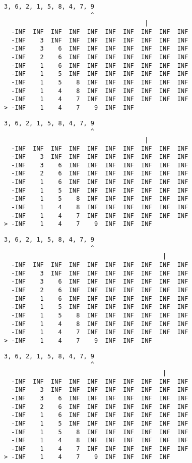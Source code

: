 { \begin{verbatim}
3, 6, 2, 1, 5, 8, 4, 7, 9
                        ^
                                       |
  -INF  INF  INF  INF  INF  INF  INF  INF  INF  INF
  -INF    3  INF  INF  INF  INF  INF  INF  INF  INF
  -INF    3    6  INF  INF  INF  INF  INF  INF  INF
  -INF    2    6  INF  INF  INF  INF  INF  INF  INF
  -INF    1    6  INF  INF  INF  INF  INF  INF  INF
  -INF    1    5  INF  INF  INF  INF  INF  INF  INF
  -INF    1    5    8  INF  INF  INF  INF  INF  INF
  -INF    1    4    8  INF  INF  INF  INF  INF  INF
  -INF    1    4    7  INF  INF  INF  INF  INF  INF
> -INF    1    4    7    9  INF  INF               
\end{verbatim} }

{ \begin{verbatim}
3, 6, 2, 1, 5, 8, 4, 7, 9
                        ^
                                       |
  -INF  INF  INF  INF  INF  INF  INF  INF  INF  INF
  -INF    3  INF  INF  INF  INF  INF  INF  INF  INF
  -INF    3    6  INF  INF  INF  INF  INF  INF  INF
  -INF    2    6  INF  INF  INF  INF  INF  INF  INF
  -INF    1    6  INF  INF  INF  INF  INF  INF  INF
  -INF    1    5  INF  INF  INF  INF  INF  INF  INF
  -INF    1    5    8  INF  INF  INF  INF  INF  INF
  -INF    1    4    8  INF  INF  INF  INF  INF  INF
  -INF    1    4    7  INF  INF  INF  INF  INF  INF
> -INF    1    4    7    9  INF  INF  INF          
\end{verbatim} }

{ \begin{verbatim}
3, 6, 2, 1, 5, 8, 4, 7, 9
                        ^
                                            |
  -INF  INF  INF  INF  INF  INF  INF  INF  INF  INF
  -INF    3  INF  INF  INF  INF  INF  INF  INF  INF
  -INF    3    6  INF  INF  INF  INF  INF  INF  INF
  -INF    2    6  INF  INF  INF  INF  INF  INF  INF
  -INF    1    6  INF  INF  INF  INF  INF  INF  INF
  -INF    1    5  INF  INF  INF  INF  INF  INF  INF
  -INF    1    5    8  INF  INF  INF  INF  INF  INF
  -INF    1    4    8  INF  INF  INF  INF  INF  INF
  -INF    1    4    7  INF  INF  INF  INF  INF  INF
> -INF    1    4    7    9  INF  INF  INF          
\end{verbatim} }

{ \begin{verbatim}
3, 6, 2, 1, 5, 8, 4, 7, 9
                        ^
                                            |
  -INF  INF  INF  INF  INF  INF  INF  INF  INF  INF
  -INF    3  INF  INF  INF  INF  INF  INF  INF  INF
  -INF    3    6  INF  INF  INF  INF  INF  INF  INF
  -INF    2    6  INF  INF  INF  INF  INF  INF  INF
  -INF    1    6  INF  INF  INF  INF  INF  INF  INF
  -INF    1    5  INF  INF  INF  INF  INF  INF  INF
  -INF    1    5    8  INF  INF  INF  INF  INF  INF
  -INF    1    4    8  INF  INF  INF  INF  INF  INF
  -INF    1    4    7  INF  INF  INF  INF  INF  INF
> -INF    1    4    7    9  INF  INF  INF  INF     
\end{verbatim} }

